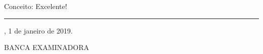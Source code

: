 \documentclass[
	12pt,				%
	openright,			%
	twoside,			%
	a4paper,			%
	english,			%
	brazil				%
	]{abntex2}
\begin{document}



%
% 
%
\begin{folhadeaprovacao}

  \begin{center}
    {\ABNTEXchapterfont\large\imprimirautor}

    \vspace*{\fill}\vspace*{\fill}
    \begin{center}
      \ABNTEXchapterfont\bfseries\Large\imprimirtitulo
    \end{center}
    \vspace*{\fill}
    
    \hspace{.45\textwidth}
    \begin{minipage}{.5\textwidth}
        \imprimirpreambulo
    \end{minipage}%
    \vspace*{\fill}
   \end{center}
        
   Conceito: Excelente!\rule{3cm}{.1pt}
   
   \imprimirlocal, 1 de janeiro de 2019.
   
   \vspace{1cm}
   \begin{center}
   BANCA EXAMINADORA
   \end{center}
    

      

  
\end{folhadeaprovacao}
\end{document}
